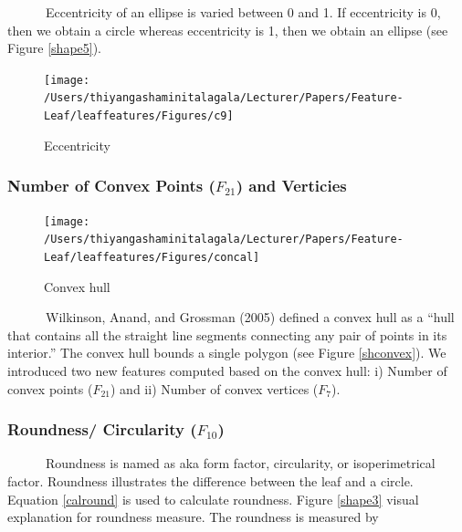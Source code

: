 \documentclass{article}
\begin{document}
~~~~~~Eccentricity of an ellipse is varied between 0 and 1. If
eccentricity is 0, then we obtain a circle whereas eccentricity is 1,
then we obtain an ellipse (see Figure \ref{shape5}).

\begin{figure}[!ht]

{\centering \texttt{[image: /Users/thiyangashaminitalagala/Lecturer/Papers/Feature-Leaf/leaffeatures/Figures/c9]} 

}

\caption{\label{shape5}Eccentricity}\label{fig:unnamed-chunk-19}
\end{figure}

\newpage

\hypertarget{number-of-convex-points-f_21-and-verticies}{%
\subsubsection{\texorpdfstring{Number of Convex Points (\(F_{21}\)) and
Verticies}{Number of Convex Points (F\_\{21\}) and Verticies}}\label{number-of-convex-points-f_21-and-verticies}}

\begin{figure}[!ht]

{\centering \texttt{[image: /Users/thiyangashaminitalagala/Lecturer/Papers/Feature-Leaf/leaffeatures/Figures/concal]} 

}

\caption{\label{shconvex}Convex hull}\label{fig:unnamed-chunk-20}
\end{figure}

~~~~~~Wilkinson, Anand, and Grossman (2005) defined a convex hull as a
``hull that contains all the straight line segments connecting any pair
of points in its interior.'' The convex hull bounds a single polygon
(see Figure \ref{shconvex}). We introduced two new features computed
based on the convex hull: i) Number of convex points (\(F_{21}\)) and
ii) Number of convex vertices (\(F_7\)).

\hypertarget{roundness-circularity-f_10}{%
\subsubsection{\texorpdfstring{Roundness/ Circularity
(\(F_{10}\))}{Roundness/ Circularity (F\_\{10\})}}\label{roundness-circularity-f_10}}

~~~~~~Roundness is named as aka form factor, circularity, or
isoperimetrical factor. Roundness illustrates the difference between the
leaf and a circle. Equation \ref{calround} is used to calculate
roundness. Figure \ref{shape3} visual explanation for roundness measure.
The roundness is measured by
\end{document}
